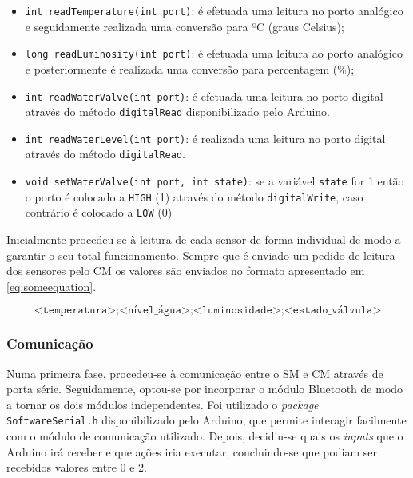 \begin{itemize}
	\item \texttt{int readTemperature(int port)}: é efetuada uma leitura no porto analógico e seguidamente realizada uma conversão para ºC (graus Celsius);
	
	\item \texttt{long readLuminosity(int port)}: é efetuada uma leitura ao porto analógico e posteriormente é realizada uma conversão para percentagem (\%); 
	
	\item \texttt{int readWaterValve(int port)}: é efetuada uma leitura no porto digital através do método \texttt{digitalRead} disponibilizado pelo Arduino.
	
	\item \texttt{int readWaterLevel(int port)}: é realizada uma leitura no porto digital através do método \texttt{digitalRead}.
	
	
	\item \texttt{void setWaterValve(int port, int state)}: se a variável \texttt{state} for 1 então o porto é colocado a \texttt{HIGH} (1) através do método \texttt{digitalWrite}, caso contrário é colocado a \texttt{LOW} (0)
	
\end{itemize}

Inicialmente procedeu-se à leitura de cada sensor de forma individual de modo a garantir o seu total funcionamento. Sempre que é enviado um pedido de leitura dos sensores pelo \acl{CM} os valores são enviados no formato apresentado em \ref{eq:someequation}.

\begin{equation} 
\label{eq:someequation}
\texttt{<temperatura>;<nível\_água>;<luminosidade>;<estado\_válvula>}
\end{equation}

\subsubsection{Comunicação}


Numa primeira fase, procedeu-se à comunicação entre o \acl{SM} e \acl{CM} através de porta série. Seguidamente, optou-se por incorporar o módulo Bluetooth de modo a tornar os dois módulos independentes. Foi utilizado o  \textit{package} \texttt{SoftwareSerial.h} disponibilizado pelo Arduino, que permite interagir facilmente com o módulo de comunicação utilizado. Depois, decidiu-se quais os \textit{inputs} que o Arduino irá receber e que ações iria executar, concluindo-se que podiam ser recebidos valores entre 0 e 2. 


